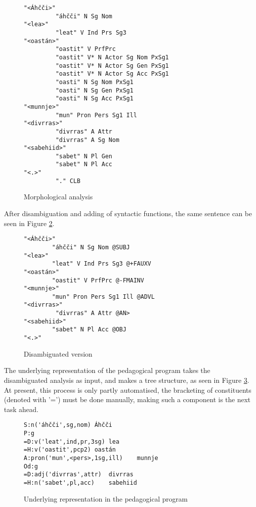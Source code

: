 \documentclass[a4paper,english]{article}
\begin{document}
\begin{figure}[htdp]
\caption{Morphological analysis}
\begin{center}
\begin{verbatim}
"<Áhčči>"
         "áhčči" N Sg Nom
"<lea>"
         "leat" V Ind Prs Sg3
"<oastán>"
         "oastit" V PrfPrc
         "oastit" V* N Actor Sg Nom PxSg1
         "oastit" V* N Actor Sg Gen PxSg1
         "oastit" V* N Actor Sg Acc PxSg1
         "oasti" N Sg Nom PxSg1
         "oasti" N Sg Gen PxSg1
         "oasti" N Sg Acc PxSg1
"<munnje>"
         "mun" Pron Pers Sg1 Ill
"<divrras>"
         "divrras" A Attr
         "divrras" A Sg Nom
"<sabehiid>"
         "sabet" N Pl Gen
         "sabet" N Pl Acc
"<.>"
         "." CLB
\end{verbatim}
\end{center}
\label{fatherall}
\end{figure}%

After disambiguation and adding of syntactic functions, the same sentence can be seen in Figure \ref{fatherdis}.

\begin{figure}[htdp]
\caption{Disambiguated version}
\begin{center}
\begin{verbatim}
"<Áhčči>"
        "áhčči" N Sg Nom @SUBJ
"<lea>"
        "leat" V Ind Prs Sg3 @+FAUXV
"<oastán>"
        "oastit" V PrfPrc @-FMAINV
"<munnje>"
        "mun" Pron Pers Sg1 Ill @ADVL
"<divrras>"
         "divrras" A Attr @AN>
"<sabehiid>"
        "sabet" N Pl Acc @OBJ
"<.>"
\end{verbatim}
\end{center}
\label{fatherdis}
\end{figure}%

The underlying representation of the pedagogical program takes the disambiguated analysis as input, and makes a tree structure, as seen in Figure \ref{underlying}. At present, this process is only partly automatised, the bracketing of constituents (denoted with '=') must be done manually, making such a component is the next task ahead.

\begin{figure}[htdp]
\caption{Underlying representation in the pedagogical program}
\begin{center}
\begin{verbatim}
S:n('áhčči',sg,nom)	Áhčči
P:g
=D:v('leat',ind,pr,3sg)	lea
=H:v('oastit',pcp2)	oastán
A:pron('mun',<pers>,1sg,ill)	munnje
Od:g
=D:adj('divrras',attr)  divrras
=H:n('sabet',pl,acc)	sabehiid
\end{verbatim}
\end{center}
\label{underlying}
\end{figure}%
\end{document}
